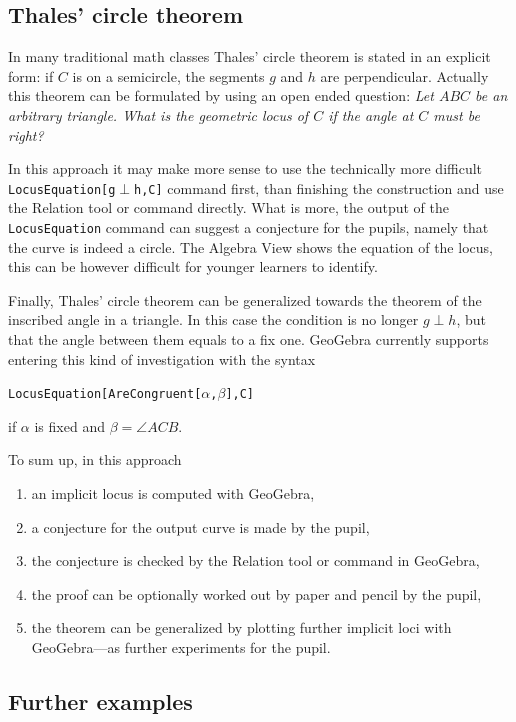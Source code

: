 \documentclass{article}
\begin{document}
\subsection{Thales' circle theorem}

In many traditional math classes Thales' circle theorem is stated in an explicit form: if $C$ is on a semicircle, the segments $g$ and $h$ are perpendicular. Actually this theorem can be formulated by using an open ended question: \textit{Let $ABC$ be an arbitrary triangle. What is the geometric locus of $C$ if the angle at $C$ must be right?}

In this approach it may make more sense to use the technically more difficult \texttt{LocusEquation[g$\perp$h,C]} command first, than finishing the construction and use the Relation tool or command directly. What is more, the output of the \texttt{LocusEquation} command can suggest a conjecture for the pupils, namely that the curve is indeed a circle. The Algebra View shows the equation of the locus, this can be however difficult for younger learners to identify.

Finally, Thales' circle theorem can be generalized towards the theorem of the inscribed angle in a triangle. In this case the condition is no longer $g\perp h$, but that the angle between them equals to a fix one. GeoGebra currently supports entering this kind of investigation with the syntax
\begin{center}
\texttt{LocusEquation[AreCongruent[$\alpha$,$\beta$],C]}
\end{center}
if $\alpha$ is fixed and $\beta=\angle{ACB}$.

To sum up, in this approach
\begin{enumerate}
    \item an implicit locus is computed with GeoGebra,
    \item a conjecture for the output curve is made by the pupil,
    \item the conjecture is checked by the Relation tool or command in GeoGebra,
    \item the proof can be optionally worked out by paper and pencil by the pupil,
    \item the theorem can be generalized by plotting further implicit loci with GeoGebra---as further experiments for the pupil.
\end{enumerate}

\subsection{Further examples}
\end{document}
